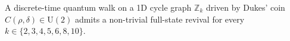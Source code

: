 \begin{theorem}[1D existence]
\label{thm:1d-existence}
A discrete-time quantum walk on a 1D cycle graph
$\mathbb{Z}_k$ driven by Dukes' coin $C(\rho, \delta) \in
\mathrm{U}(2)$ admits a non-trivial full-state revival for
every $k \in \{2, 3, 4, 5, 6, 8, 10\}$.
\end{theorem}
